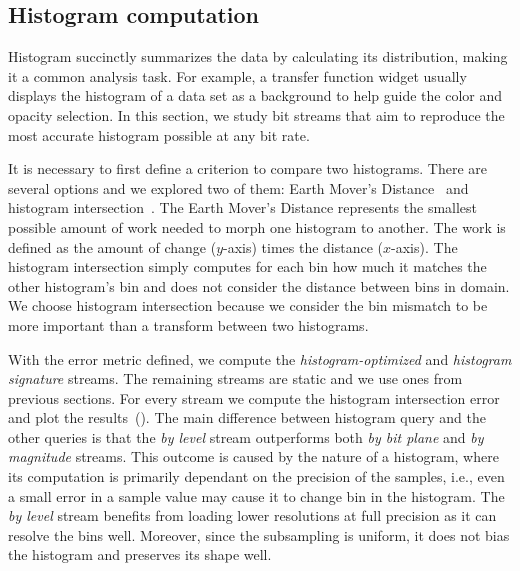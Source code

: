 \subsection{Histogram computation}
\label{sec:histogram}


Histogram succinctly summarizes the data by calculating its distribution, making it a
common analysis task. For example, a transfer function widget usually displays the histogram
of a data set as a background to help guide the color and opacity selection.
In this section, we study bit streams that aim to reproduce the most accurate
histogram possible at any bit rate.

It is necessary to first define a criterion to compare two
histograms. There are several options and we explored two of them: Earth Mover's Distance~\cite{emd1998} and
histogram intersection~\cite{histogram_intersection1991}. The Earth Mover's Distance represents
the smallest possible amount of work needed to morph one histogram to another. The work is defined as the
amount of change ($y$-axis) times the distance ($x$-axis). The histogram intersection simply computes for each
bin how much it matches the other histogram's bin and does not consider the distance between bins in domain.
We choose histogram intersection because we consider the bin mismatch to be more important than a transform between two histograms.

With the error metric defined, we compute the {\em histogram-optimized} and {\em histogram signature} streams.
The remaining streams are static and we use ones from previous sections. For every stream we compute the histogram
intersection error and plot the results~(). The main difference between histogram query
and the other queries is that the {\em by level} stream outperforms both {\em by bit plane} and {\em by magnitude} streams.
This outcome is caused by the nature of a histogram, where its computation is primarily dependant on the precision of the samples,
i.e., even a small error in a sample value may cause it to change bin in the histogram. The {\em by level} stream benefits from
loading lower resolutions at full precision as it can resolve the bins well. Moreover, since the subsampling is uniform, it does
not bias the histogram and preserves its shape well.


